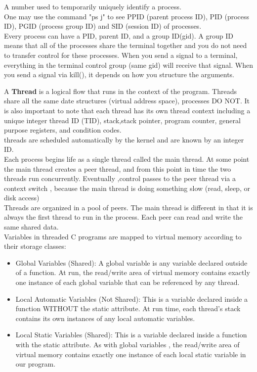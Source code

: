 \documentclass[15pt,idxtotoc,hyperref,openany]{labbook} %
\begin{document}
A number used to temporarily uniquely identify a process.\\
One may use the command "ps j" to see PPID (parent process ID), PID (process ID), PGID (process group ID) and SID (session ID) of processes.   \\

Every process can have a PID, parent ID, and a group ID(gid).  A group ID means that all of the processes share the terminal together and you do not need to transfer control for these processes.  When you send a signal to a terminal, everything in the terminal control group (same gid) will receive that signal. When you send a signal via kill(), it depends on how you structure the arguments.



A {\bf Thread} is a logical flow that runs in the context of the program.  Threads share all the same date structures (virtual address space), processes DO NOT.  It is also important to note that each thread has its own thread context including a unique integer thread ID (TID), stack,stack pointer, program counter, general purpose registers, and condition codes.\\

threads  are scheduled automatically by the kernel and are known by an integer ID.\\
Each process begins life as a single thread called the main thread.  At some point the main thread creates a peer thread, and from this point in time the two threads run concurrently.  Eventually ,control passes to the peer thread via a context switch , because the main thread is doing something slow (read, sleep, or disk access)\\

Threads are organized in a pool of peers.  The main thread is different in that it is always the first thread to run in the process.  Each peer can read and write the same shared data.\\

Variables in threaded C programs are mapped to virtual memory according to their storage classes:
\begin{itemize}
\item Global Variables (Shared):  A global variable is any variable declared outside of a function.  At run, the read/write area of virtual memory contains exactly one instance of each global variable that can be referenced by any thread.
\item Local Automatic Variables (Not Shared): This is a variable declared inside a function WITHOUT the static attribute.  At run time, each thread's stack contains its own instances of any local automatic variables.
\item Local Static Variables (Shared):  This is a variable declared inside a function with the static attribute.  As with global variables , the read/write area of virtual memory contains exactly one instance of each local static variable in our program.
\end{itemize}
\end{document}
